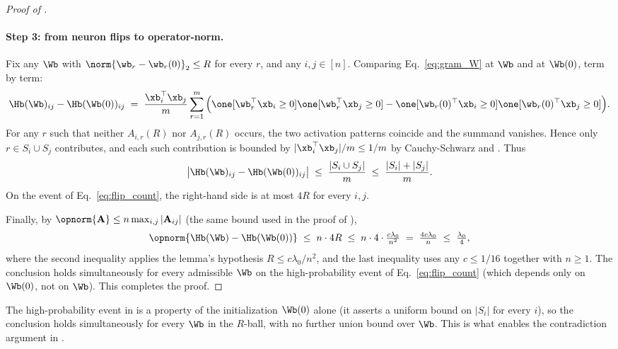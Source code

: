 \begin{proof}[Proof of ]
\paragraph{Step 3: from neuron flips to operator-norm.}
Fix any $\Wb$ with $\norm{\wb_r - \wb_r(0)}_2 \le R$ for every $r$, and any $i, j \in [n]$. Comparing Eq.~\eqref{eq:gram_W} at $\Wb$ and at $\Wb(0)$, term by term:
\begin{align*}
\Hb(\Wb)_{ij} - \Hb(\Wb(0))_{ij}
\;=\; \frac{\xb_i^\top \xb_j}{m} \sum_{r = 1}^m \Big( \one[\wb_r^\top \xb_i \ge 0] \one[\wb_r^\top \xb_j \ge 0] - \one[\wb_r(0)^\top \xb_i \ge 0] \one[\wb_r(0)^\top \xb_j \ge 0] \Big).
\end{align*}
For any $r$ such that neither $A_{i,r}(R)$ nor $A_{j,r}(R)$ occurs, the two activation patterns coincide and the summand vanishes. Hence only $r \in S_i \cup S_j$ contributes, and each such contribution is bounded by $|\xb_i^\top \xb_j|/m \le 1/m$ by Cauchy-Schwarz and . Thus
\begin{align}\label{eq:H_pertW_entry}
\big| \Hb(\Wb)_{ij} - \Hb(\Wb(0))_{ij} \big|
\;\le\; \frac{|S_i \cup S_j|}{m}
\;\le\; \frac{|S_i| + |S_j|}{m}.
\end{align}
On the event of Eq.~\eqref{eq:flip_count}, the right-hand side is at most $4 R$ for every $i, j$.

Finally, by $\opnorm{\mathbf A} \le n \max_{i,j} |\mathbf A_{ij}|$ (the same bound used in the proof of ),
\begin{align*}
\opnorm{ \Hb(\Wb) - \Hb(\Wb(0)) }
\;\le\; n \cdot 4 R
\;\le\; n \cdot 4 \cdot \tfrac{c \lambda_0}{n^2}
\;=\; \tfrac{4 c \lambda_0}{n}
\;\le\; \tfrac{\lambda_0}{4},
\end{align*}
where the second inequality applies the lemma's hypothesis $R \le c \lambda_0 / n^2$, and the last inequality uses any $c \le 1/16$ together with $n \ge 1$. The conclusion holds simultaneously for every admissible $\Wb$ on the high-probability event of Eq.~\eqref{eq:flip_count} (which depends only on $\Wb(0)$, not on $\Wb$). This completes the proof.
\end{proof}

\begin{remark}\label{rem:perturbation_uniformity}
The high-probability event in  is a property of the initialization $\Wb(0)$ alone (it asserts a uniform bound on $|S_i|$ for every $i$), so the conclusion holds simultaneously for every $\Wb$ in the $R$-ball, with no further union bound over $\Wb$. This is what enables the contradiction argument in .
\end{remark}
